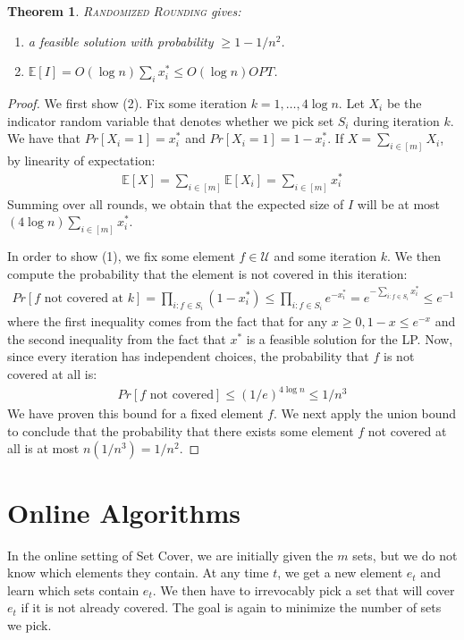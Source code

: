 \documentclass[10pt,a4paper]{article}
\newtheorem{thm}{Theorem}[section]
\newcommand{\mU}{\mathcal{U}}
\begin{document}
\begin{thm}
\textsc{Randomized Rounding} gives:
\begin{enumerate}
\item a feasible solution with probability $\geq 1-1/n^2$.
\item $\mathbb{E}[I] = O(\log n) \sum_{i}x_i^* \leq O(\log n) OPT$.
\end{enumerate}
\end{thm}

\begin{proof}
We first show (2). Fix some iteration $k = 1, \dots, 4 \log n$. Let $X_i$ be the indicator random variable that denotes whether we pick set $S_i$ during iteration $k$. We have that $Pr[X_i = 1] = x_i^*$ and  $Pr[X_i = 1] = 1- x_i^*$. If $X = \sum_{i \in [m]} X_i$, by linearity of expectation:
\begin{align*}
\mathbb{E}[X] = \sum_{i \in [m]} \mathbb{E}[X_i] = \sum_{i \in [m]} x_i^*
\end{align*} 
Summing over all rounds, we obtain that the expected size of $I$ will be at most $(4 \log n) \sum_{i \in [m]} x_i^*$.

In order to show (1), we fix some element $f \in \mU$ and some iteration $k$. We then compute the probability that the element is not covered in this iteration:
\begin{align*}
Pr[f \text{ not covered at } k] = \prod_{i: f \in S_i} (1 - x_i^*) \leq \prod_{i: f \in S_i} e^{-x_i^*} = e^{-\sum_{i: f \in S_i} x_i^*} \leq e^{-1}
\end{align*}
where the first inequality comes from the fact that for any $x \geq 0, 1-x \leq e^{-x}$ and the second inequality from the fact that $x^*$ is a feasible solution for the LP. Now, since every iteration has independent choices, the probability that $f$ is not covered at all is:
\begin{align*}
Pr[f \text{ not covered}] \leq (1/e)^{4 \log n} \leq 1/n^3
\end{align*}
We have proven this bound for a fixed element $f$. We next apply the union bound to conclude that the probability that there exists some element $f$ not covered at all is at most $n (1/n^3) = 1/n^2$.
\end{proof}

\section{Online Algorithms}

In the online setting of Set Cover, we are initially given the $m$ sets, but we do not know which elements they contain. At any time $t$, we get a new element $e_t$ and learn which sets contain $e_t$. We then have to irrevocably pick a set that will cover $e_t$ if it is not already covered. The goal is again to minimize the number of sets we pick.
\end{document}
